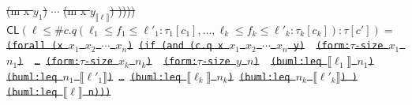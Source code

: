 \documentclass[10pt,fleqn,final]{scrreprt}
\newcommand*{\CL}{\ensuremath{\mathsf{CL}}\xspace}
\newenvironment{definitions}[0]{\medskip }{}
\newcommand{\sem}[1]{\mathopen\llbracket#1\mathclose\rrbracket}
\newcommand{\white}[1]{{\color{white}{#1}}}
\newcommand{\qqquad}{\white{x}\qquad}
\providecommand{\DIFdel}[1]{{\protect\color{red}\sout{#1}}}                      %
\providecommand{\DIFdelend}{} %
\begin{document}
\begin{definitions}
{%
\DIFdel{(m x  $y_1$)}%
\DIFdel{$\cdots$}%
\DIFdel{(m x $y_{\sem{\ell}}$) ))))}}
\DIFdel{$\CL(\ell \leq \mathsf{\#}c.q(\ell_1 \leq f_1 \leq \ell'_1: \tau_1[c_1], \ldots, \ell_k\leq f_k \leq \ell'_k: \tau_k[c_k]) : \tau[c'])=$}%
\texttt{\DIFdel{(forall (x $x_1$ $x_2$ $\cdots$  $x_n$)}%
\DIFdel{(if (and (c.q x $x_1$ $x_2$ $\cdots$  $x_n$ y) }%
\DIFdel{(form:$\tau$-size $x_1$ $n_1$) }%
\DIFdel{\ldots}%
\DIFdel{(form:$\tau$-size $x_k$ $n_k$) }%
\DIFdel{(form:$\tau$-size $y$ $n$) }%
\DIFdel{(buml:leq $\sem{\ell_1}$ $n_1$)}%
\DIFdel{(buml:leq $n_1$ $\sem{\ell'_1}$)}%
\DIFdel{\ldots}%
\DIFdel{(buml:leq $\sem{\ell_k}$ $n_k$)}%
\DIFdel{(buml:leq $n_k$ $\sem{\ell'_k}$) )}%
\DIFdel{(buml:leq $\sem{\ell}$ n)))}}
\DIFdelend %
 \begin{lstlisting}[language=clif, mathescape]

\end{lstlisting}
\end{definitions}
\end{document}
